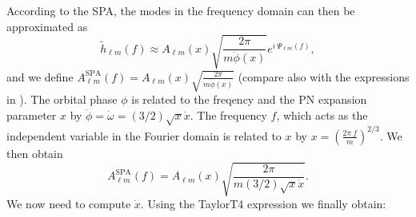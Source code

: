 \documentclass[twocolumn,prd,aps,superscriptaddress,preprintnumbers,tightenlines,showpacs,nofootinbib,eqsecnum,amsfonts,amsmath]{revtex4}
\begin{document}
%
%
According to the SPA, the modes in the frequency domain can then be approximated as
\begin{equation}
\tilde{h}_{\ell m}(f) \approx A_{\ell m}(x) \sqrt{\frac{2 \pi}{m \ddot{\phi}(x)}} e^{i \:\Psi_{\ell m}(f)},
\end{equation}
and we define $A^{\mathrm{SPA}}_{\ell m}(f) = A_{\ell m}(x) \sqrt{\frac{2 \pi}{m \ddot{\phi}(x)}}$
(compare also with the expressions in \cite{Santamaria:2010yb}).
The orbital phase $\phi$ is related to the freqency and the PN expansion parameter $x$ by $\ddot{\phi} = \dot{\omega} = (3/2)\sqrt{x} \dot{x}$. The frequency $f$, which acts as the independent variable in the Fourier domain is related to $x$ by $x= \left( \frac{2\pi \:f}{m} \right)^{2/3}$. We then obtain
\begin{equation}\label{eq:spaamp}
A^{\mathrm{SPA}}_{\ell m}(f) = A_{\ell m}(x) \sqrt{\frac{2 \pi}{m (3/2)\sqrt{x} \dot{x}}}.
\end{equation}
We now need to compute $\dot{x}$. Using the TaylorT4 expression \cite{Taylors} we finally obtain:
%
\end{document}
